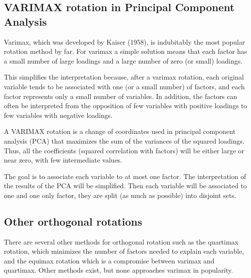 \subsection{VARIMAX rotation in Principal Component Analysis}
Varimax, which was developed by Kaiser (1958), is indubitably the most
popular rotation method by far. For varimax a simple solution means that each
factor has a small number of large loadings and a large number of zero (or small)
loadings.

This simplifies the interpretation because, after a varimax rotation,
each original variable tends to be associated with one (or a small number) of
factors, and each factor represents only a small number of variables. In addition,
the factors can often be interpreted from the opposition of few variables with
positive loadings to few variables with negative loadings.


A VARIMAX rotation is a change of coordinates used in principal component analysis (PCA) that maximizes the sum of the variances of the squared loadings. Thus, all the coefficients (squared correlation with factors) will be either large or near zero, with few intermediate values.

The goal is to associate each variable to at most one factor. The interpretation of the results of the PCA will be simplified. Then each variable will be associated to one and one only factor, they are split (as much as possible) into disjoint sets.


\subsection{Other orthogonal rotations}
There are several other methods for orthogonal rotation such as the quartimax
rotation, which minimizes the number of factors needed to explain each
variable, and the equimax rotation which is a compromise between varimax
and quartimax. Other methods exist, but none approaches varimax in popularity. 